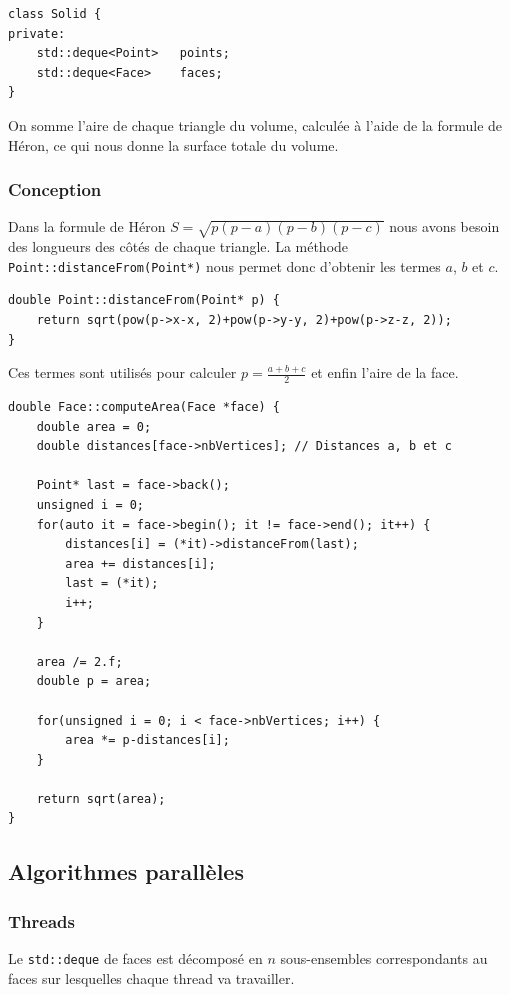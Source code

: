 \documentclass[a4paper]{article}
\begin{document}
		\begin{lstlisting}
class Solid {
private:
    std::deque<Point>   points;
    std::deque<Face>    faces;
}
		\end{lstlisting}

		On somme l'aire de chaque triangle du volume, calculée à l'aide de la formule de Héron, ce qui nous donne la surface totale du volume.
		\subsubsection{Conception}
		Dans la formule de Héron $S = \sqrt{p(p-a)(p-b)(p-c)}$ nous avons besoin des longueurs des côtés de chaque triangle. La méthode \texttt{Point::distanceFrom(Point*)} nous permet donc d'obtenir les termes $a$, $b$ et $c$.
		\begin{lstlisting}
double Point::distanceFrom(Point* p) {
	return sqrt(pow(p->x-x, 2)+pow(p->y-y, 2)+pow(p->z-z, 2));
}
		\end{lstlisting}

		Ces termes sont utilisés pour calculer $\displaystyle p = \frac{a+b+c}{2}$ et enfin l'aire de la face.
		\begin{lstlisting}
double Face::computeArea(Face *face) {
	double area = 0;
	double distances[face->nbVertices]; // Distances a, b et c

	Point* last = face->back();
	unsigned i = 0;
	for(auto it = face->begin(); it != face->end(); it++) {
	    distances[i] = (*it)->distanceFrom(last);
	    area += distances[i];
	    last = (*it);
	    i++;
	}

	area /= 2.f;
	double p = area;

	for(unsigned i = 0; i < face->nbVertices; i++) {
	    area *= p-distances[i];
	}

	return sqrt(area);
}
		\end{lstlisting}

	\subsection{Algorithmes parallèles}
		\subsubsection{Threads}
		Le \texttt{std::deque} de faces est décomposé en $n$ sous-ensembles correspondants au faces sur lesquelles chaque thread va travailler.
\end{document}
